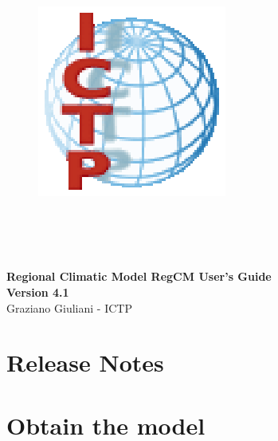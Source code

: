 \documentclass[11pt,twoside,a4paper]{report}
\begin{document}
\begin{titlepage}

\begin{figure}
\vspace{-35pt}
\begin{center}
\includegraphics{ICTP_logo}
\end{center}
\end{figure}

\\
 \\
 \\

\vspace{3cm}

\begin{center}
{\Large
  {\bf Regional Climatic Model RegCM User's Guide} \\
  {\bf Version 4.1} \\
  \vspace{2cm}
  Graziano Giuliani  - ICTP
}
\end{center}

\end{titlepage}

\cleardoublepage

\tableofcontents

\cleardoublepage

\chapter{Release Notes}


\chapter{Obtain the model}

\end{document}
